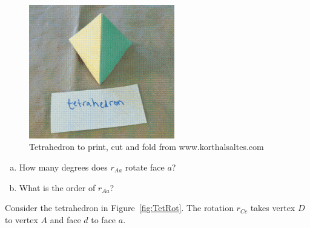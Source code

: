 \begin{figure}[ht]
\begin{center}
\includegraphics[width=2.5in]{images/TetrahedronFold.png}
\caption{Tetrahedron to print, cut and fold from www.korthalsaltes.com}
 \label{fig:TetraFold}
\end{center}
\end{figure}

\begin{exercise}\label{exercise:actions:Tetra 1}
\begin{enumerate}[(a)]
\item How many degrees does $ r_{Aa}$ rotate face $a$?
\item What is the order of $r_{Aa}$?
\end{enumerate}

\end{exercise}
Consider the tetrahedron in Figure~\ref{fig:TetRot}.  The rotation $r_{Cc}$ takes vertex $D$ to vertex $A$ and face $d$ to face $a$.  

